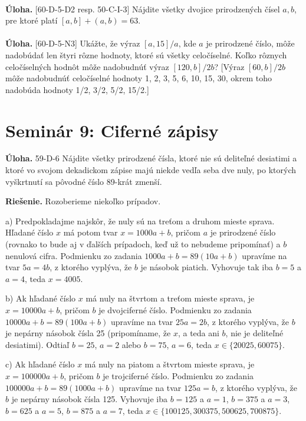 \documentclass[11pt,a4paper,oneside,final]{book}
\newcommand{\ul}{\textbf{Úloha.} }
\newcommand{\rie}{\textbf{Riešenie.} }
\begin{document}
\\
\begin{tcolorbox}[breakable,notitle,boxrule=0pt,colback=light-gray,colframe=light-gray]\ul [60-D-5-D2 resp. 50-C-I-3] Nájdite všetky dvojice prirodzených čísel $a, b$, pre ktoré platí $[a, b] + (a, b) = 63$.\\
\\
\ul [60-D-5-N3] Ukážte, že výraz $[a, 15]/a$, kde $a$ je prirodzené číslo, môže nadobúdať len štyri rôzne hodnoty, ktoré sú všetky celočíselné. Koľko rôznych celočíselných hodnôt môže nadobudnúť výraz $[120, b]/2b$? [Výraz $[60, b]/2b$ môže nadobudnúť celočíselné hodnoty 1, 2, 3, 5, 6, 10, 15, 30, okrem toho nadobúda hodnoty 1/2, 3/2, 5/2, 15/2.]
\end{tcolorbox}

\section*{Seminár 9: Ciferné zápisy}
\begin{tcolorbox}[breakable,notitle,boxrule=0pt,colback=light-gray,colframe=light-gray]\ul  59-D-6 Nájdite všetky prirodzené čísla, ktoré nie sú deliteľné desiatimi a ktoré vo svojom dekadickom zápise majú niekde vedľa seba dve nuly, po ktorých vyškrtnutí sa pôvodné číslo 89-krát zmenší.

\end{tcolorbox}

\rie Rozoberieme niekoľko prípadov.

a) Predpokladajme najskôr, že nuly sú na treťom a druhom mieste sprava. Hľadané číslo $x$ má potom tvar $x = 1 000a + b$, pričom $a$ je prirodzené číslo (rovnako to bude aj v ďalších prípadoch, keď už to nebudeme pripomínať) a $b$ nenulová cifra. Podmienku
zo zadania $1 000a + b = 89(10a + b)$ upravíme na tvar $5a = 4b$, z ktorého vyplýva, že $b$ je násobok piatich. Vyhovuje tak iba $b = 5$ a $a = 4$, teda $x = 4 005$.

b) Ak hľadané číslo $x$ má nuly na štvrtom a treťom mieste sprava, je $x = 10 000a+b$, pričom $b$ je dvojciferné číslo. Podmienku zo zadania $10 000a+b = 89(100a+b)$ upravíme na tvar $25a = 2b$, z ktorého vyplýva, že $b$ je nepárny násobok čísla 25 (pripomíname, že $x$, a teda ani $b$, nie je deliteľné desiatimi). Odtiaľ $b = 25$, $a = 2$ alebo $b = 75$, $a = 6$, teda $x \in \{20 025, 60 075\}$.

c) Ak hľadané číslo $x$ má nuly na piatom a štvrtom mieste sprava, je $x = 100 000a+ b$, pričom $b$ je trojciferné číslo. Podmienku zo zadania $100 000a + b = 89(1 000a + b)$ upravíme na tvar $125a = b$, z ktorého vyplýva, že $b$ je nepárny násobok čísla 125.
Vyhovuje iba $b = 125$ a $a = 1$, $b = 375$ a $a = 3$, $b = 625$ a $a = 5$, $b = 875$ a $a = 7$, teda $x \in \{100 125, 300 375, 500 625, 700 875\}$.
\end{document}
